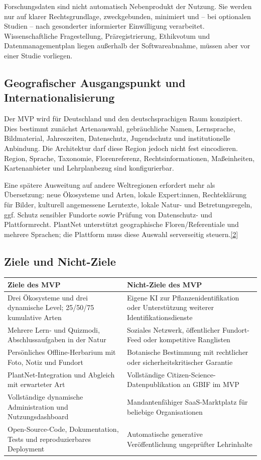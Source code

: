 \documentclass[10pt,a4paper,oneside]{article}
\newcommand{\Src}[1]{\hyperlink{src:#1}{\textcolor{Forest}{[#1]}}}
\begin{document}
Forschungsdaten sind nicht automatisch Nebenprodukt der Nutzung. Sie werden nur auf klarer Rechtsgrundlage, zweckgebunden, minimiert und -- bei optionalen Studien -- nach gesonderter informierter Einwilligung verarbeitet. Wissenschaftliche Fragestellung, Präregistrierung, Ethikvotum und Datenmanagementplan liegen außerhalb der Softwareabnahme, müssen aber vor einer Studie vorliegen.

\subsection{Geografischer Ausgangspunkt und Internationalisierung}

Der MVP wird für Deutschland und den deutschsprachigen Raum konzipiert. Dies bestimmt zunächst Artenauswahl, gebräuchliche Namen, Lernsprache, Bildmaterial, Jahreszeiten, Datenschutz, Jugendschutz und institutionelle Anbindung. Die Architektur darf diese Region jedoch nicht fest eincodieren. Region, Sprache, Taxonomie, Florenreferenz, Rechtsinformationen, Maßeinheiten, Kartenanbieter und Lehrplanbezug sind konfigurierbar.

Eine spätere Ausweitung auf andere Weltregionen erfordert mehr als Übersetzung: neue Ökosysteme und Arten, lokale Expert:innen, Rechteklärung für Bilder, kulturell angemessene Lerntexte, lokale Natur- und Betretungsregeln, ggf. Schutz sensibler Fundorte sowie Prüfung von Datenschutz- und Plattformrecht. PlantNet unterstützt geographische Floren/Referentiale und mehrere Sprachen; die Plattform muss diese Auswahl serverseitig steuern.\Src{2}

\subsection{Ziele und Nicht-Ziele}

\begin{tabularx}{\textwidth}{@{}X X@{}}
\toprule
\textbf{Ziele des MVP} & \textbf{Nicht-Ziele des MVP} \\
\midrule
Drei Ökosysteme und drei dynamische Level; 25/50/75 kumulative Arten & Eigene KI zur Pflanzenidentifikation oder Unterstützung weiterer Identifikationsdienste \\
Mehrere Lern- und Quizmodi, Abschlussaufgaben in der Natur & Soziales Netzwerk, öffentlicher Fundort-Feed oder kompetitive Ranglisten \\
Persönliches Offline-Herbarium mit Foto, Notiz und Fundort & Botanische Bestimmung mit rechtlicher oder sicherheitskritischer Garantie \\
PlantNet-Integration und Abgleich mit erwarteter Art & Vollständige Citizen-Science-Datenpublikation an GBIF im MVP \\
Vollständige dynamische Administration und Nutzungsdashboard & Mandantenfähiger SaaS-Marktplatz für beliebige Organisationen \\
Open-Source-Code, Dokumentation, Tests und reproduzierbares Deployment & Automatische generative Veröffentlichung ungeprüfter Lehrinhalte \\
\bottomrule
\end{tabularx}
\end{document}

